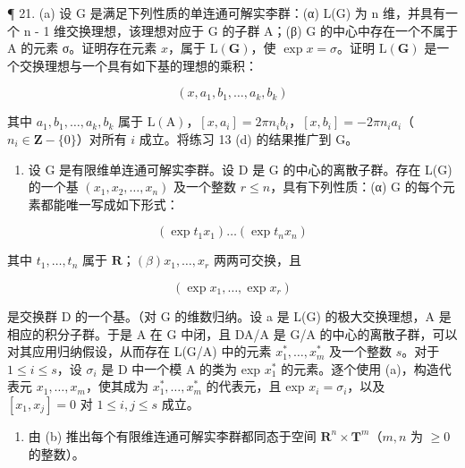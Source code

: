 ¶ 21. (a) 设 G 是满足下列性质的单连通可解实李群：(α) L(G) 为 n 维，并具有一个 n - 1 维交换理想，该理想对应于 G 的子群 A；(β) G 的中心中存在一个不属于 A 的元素 σ。证明存在元素 \(x\)，属于 \(\mathrm{L}(\mathbf{G})\)，使 \(\exp x = \sigma\)。证明 \(\mathrm{L}(\mathbf{G})\) 是一个交换理想与一个具有如下基的理想的乘积：

\[
(x, a _ {1}, b _ {1}, \dots , a _ {k}, b _ {k})
\]

 其中 \(a_1, b_1, \ldots, a_k, b_k\) 属于 \(\mathrm{L}(\mathrm{A})\)，\([x, a_i] = 2\pi n_i b_i\)，\([x, b_i] = -2\pi n_i a_i\)（\(n_i \in \mathbf{Z} - \{0\}\)）对所有 \(i\) 成立。将练习 13 (d) 的结果推广到 G。

\begin{enumerate}
\def\labelenumi{(\alph{enumi})}
\setcounter{enumi}{1}
\tightlist
\item
  设 G 是有限维单连通可解实李群。设 D 是 G 的中心的离散子群。存在 L(G) 的一个基 \((x_{1}, x_{2}, \ldots, x_{n})\) 及一个整数 \(r \leqslant n\)，具有下列性质：(α) G 的每个元素都能唯一写成如下形式：
\end{enumerate}

\[
\left(\exp t _ {1} x _ {1}\right) \dots \left(\exp t _ {n} x _ {n}\right)
\]

  其中 \(t_1, \ldots, t_n\) 属于 \(\mathbf{R}\)；\((\beta)x_1, \ldots, x_r\) 两两可交换，且

\[
(\exp x _ {1}, \dots , \exp x _ {r})
\]

  是交换群 D 的一个基。（对 G 的维数归纳。设 a 是 L(G) 的极大交换理想，A 是相应的积分子群。于是 A 在 G 中闭，且 DA/A 是 G/A 的中心的离散子群，可以对其应用归纳假设，从而存在 L(G/A) 中的元素 \(x_1^*, \ldots, x_m^*\) 及一个整数 \(s\)。对于 \(1 \leqslant i \leqslant s\)，设 \(\sigma_i\) 是 D 中一个模 A 的类为 exp \(x_1^*\) 的元素。逐个使用 (a)，构造代表元 \(x_1, \ldots, x_m\)，使其成为 \(x_1^*, \ldots, x_m^*\) 的代表元，且 exp \(x_i = \sigma_i\)，以及 \([x_1, x_j] = 0\) 对 \(1 \leqslant i, j \leqslant s\) 成立。

\begin{enumerate}
\def\labelenumi{(\alph{enumi})}
\setcounter{enumi}{2}
\tightlist
\item
  由 (b) 推出每个有限维连通可解实李群都同态于空间 \(\mathbf{R}^n\times \mathbf{T}^m\)（\(m,n\) 为 \(\geqslant 0\) 的整数）。
\end{enumerate}

